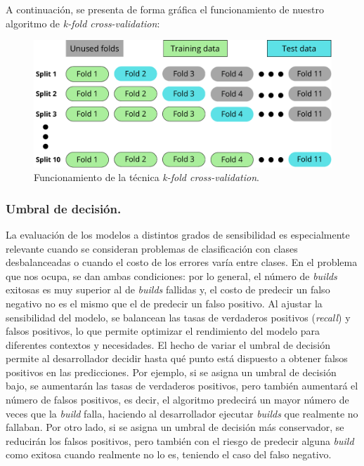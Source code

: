 A continuación, se presenta de forma gráfica el funcionamiento de nuestro algoritmo de
\textit{k-fold cross-validation}:

\begin{figure}[H]
    \centering
    \includegraphics[scale=0.5]{images/cross validation.pdf}
    \caption{Funcionamiento de la técnica \textit{k-fold cross-validation}.}
    \label{fig:confusion_matrix}
\end{figure}

\subsubsection{Umbral de decisión.}
La evaluación de los modelos a distintos grados de sensibilidad es especialmente relevante cuando
se consideran problemas de clasificación con clases desbalanceadas o cuando el costo de los
errores varía entre clases. En el problema que nos ocupa, se dan ambas condiciones: por lo
general, el número de \textit{builds} exitosas es muy superior al de \textit{builds} fallidas y,
el costo de predecir un falso negativo no es el mismo que el de predecir un falso positivo. Al
ajustar la sensibilidad del modelo, se balancean las tasas de verdaderos positivos
(\textit{recall}) y falsos positivos, lo que permite optimizar el rendimiento del modelo para
diferentes contextos y necesidades. El hecho de variar el umbral de decisión permite al
desarrollador decidir hasta qué punto está dispuesto a obtener falsos positivos en las
predicciones. Por ejemplo, si se asigna un umbral de decisión bajo, se aumentarán las tasas de
verdaderos positivos, pero también aumentará el número de falsos positivos, es decir, el algoritmo
predecirá un mayor número de veces que la \textit{build} falla, haciendo al desarrollador ejecutar
\textit{builds} que realmente no fallaban. Por otro lado, si se asigna un umbral de decisión más
conservador, se reducirán los falsos positivos, pero también con el riesgo de predecir alguna
\textit{build} como exitosa cuando realmente no lo es, teniendo el caso del falso negativo.\\


